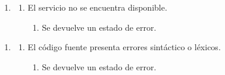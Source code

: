 \begin{framed}
\begin{description}
   \begin{enumerate} \itemsep1pt \parskip0pt 
   \setcounter{enumi}{0}
   \renewcommand{\labelenumi}{}
   \renewcommand{\labelenumiii}{\arabic{enumiii}.}
   \renewcommand{\labelenumii}{\arabic{enumi}\alph{enumii}.}
      \item 
      \begin {enumerate}
         \setcounter{enumii}{0}
         \item El servicio no se encuentra disponible.
         \begin{enumerate}
         \item Se devuelve un estado de error.
         \end{enumerate}
      \end{enumerate}
   \end{enumerate}
   \begin{enumerate} \itemsep1pt \parskip0pt 
   \setcounter{enumi}{2}
   \renewcommand{\labelenumi}{}
   \renewcommand{\labelenumiii}{\arabic{enumiii}.}
   \renewcommand{\labelenumii}{\arabic{enumi}\alph{enumii}.}
      \item 
      \begin {enumerate}
         \setcounter{enumii}{0}
         \item El código fuente presenta errores sintáctico o léxicos.
         \begin{enumerate}
         \item Se devuelve un estado de error. 
         \end{enumerate}
      \end{enumerate}
   \end{enumerate}
\end{description}
 \FloatBarrier
\end{framed}


